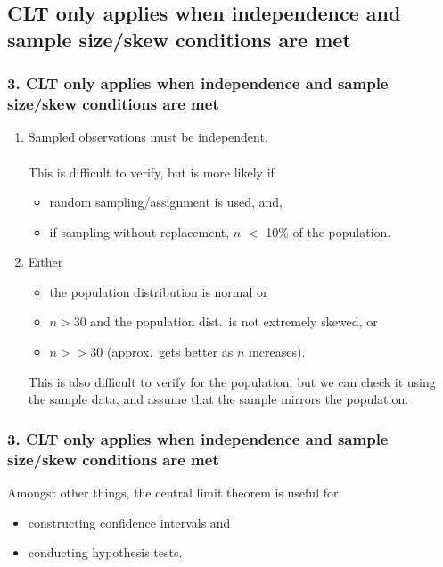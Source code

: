 \documentclass[slidestop,compress,mathserif,12pt,t,professionalfonts,xcolor=table]{beamer}
\begin{document}

\subsection{CLT only applies when independence and sample size/skew conditions are met}
\label{mi3}


\begin{frame}
\frametitle{3. CLT only applies when independence and sample size/skew conditions are met}

\begin{enumerate}

\item {} Sampled observations must be independent. \\

$\:$ \\
This is difficult to verify, but is more likely if
\begin{itemize}
\item random sampling/assignment is used, and,
\item if sampling without replacement, $n$ $<$ 10\% of the population.
\end{itemize}

\pause

 \item {} Either 

 \begin{itemize}
 \item the population distribution is normal or

 \item $n > 30$ and the population dist.\ is not extremely skewed, or

 \item $n >> 30$ (approx.\ gets better as $n$ increases).
 \end{itemize}

This is also difficult to verify for the population, but we can check it using the sample data, and assume that the sample mirrors the population.


\end{enumerate}

\end{frame}


\begin{frame}
\frametitle{3. CLT only applies when independence and sample size/skew conditions are met}

Amongst other things, the central limit theorem is useful for 
\begin{itemize}
\item constructing confidence intervals and
\item conducting hypothesis tests.
\end{itemize}

\end{frame}
\end{document}
